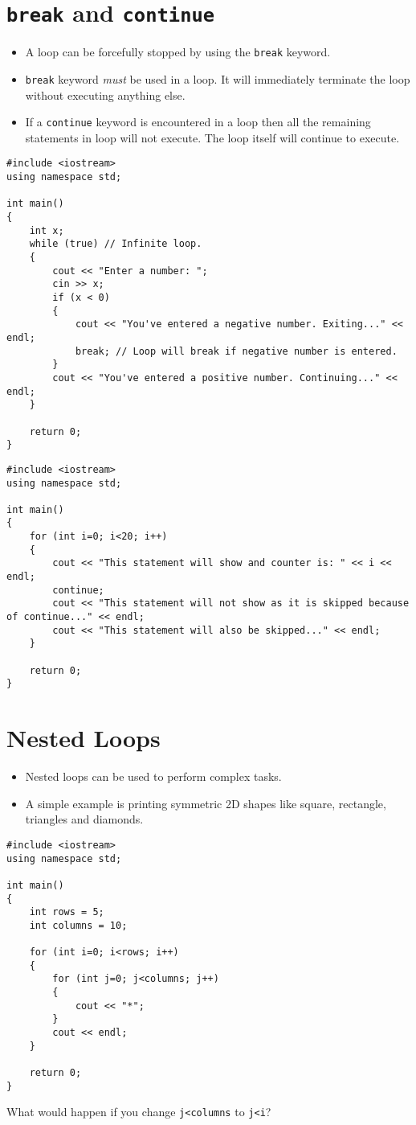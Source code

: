 \documentclass[12pt,a4paper]{article}
\begin{document}
\section{\texttt{break} and \texttt{continue}}
\begin{itemize}
\item A loop can be forcefully stopped by using the \verb|break| keyword.
\item \verb|break| keyword \emph{must} be used in a loop. It will immediately terminate the loop without executing anything else.
\item If a \verb|continue| keyword is encountered in a loop then all the remaining statements in loop will not execute. The loop itself will continue to execute.
\end{itemize}
\begin{lstlisting}[caption={Breaking a Loop}]
#include <iostream>
using namespace std;

int main()
{
	int x;
	while (true) // Infinite loop.
	{
		cout << "Enter a number: ";
		cin >> x;
		if (x < 0)
		{
			cout << "You've entered a negative number. Exiting..." << endl;
			break; // Loop will break if negative number is entered.
		}
		cout << "You've entered a positive number. Continuing..." << endl;
	}
	
	return 0;
}
\end{lstlisting}
\begin{lstlisting}[caption={Using continue in a Loop}]
#include <iostream>
using namespace std;

int main()
{
	for (int i=0; i<20; i++)
	{
		cout << "This statement will show and counter is: " << i << endl;
		continue;
		cout << "This statement will not show as it is skipped because of continue..." << endl;
		cout << "This statement will also be skipped..." << endl;
	}
	
	return 0;
}
\end{lstlisting}
\section{Nested Loops}
\begin{itemize}
\item Nested loops can be used to perform complex tasks.
\item A simple example is printing symmetric 2D shapes like square, rectangle, triangles and diamonds.
\end{itemize}
\begin{lstlisting}[caption={Using for Loop to Make Rectangle and Square}]
#include <iostream>
using namespace std;

int main()
{
	int rows = 5;
	int columns = 10;
	
	for (int i=0; i<rows; i++)
	{
		for (int j=0; j<columns; j++)
		{
			cout << "*";
		}
		cout << endl;			
	}
	
	return 0;
}
\end{lstlisting}
What would happen if you change \verb|j<columns| to \verb|j<i|?
\end{document}
